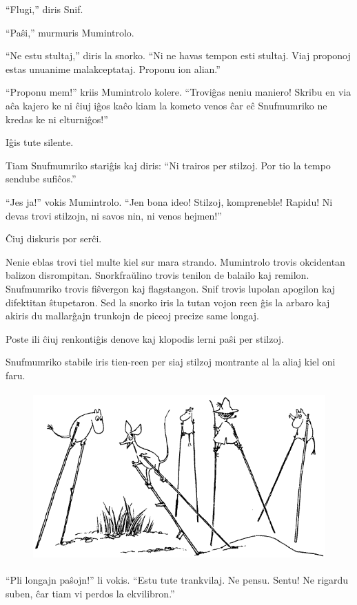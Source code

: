 ``Flugi,'' diris Snif.

``Paŝi,'' murmuris Mumintrolo.

``Ne estu stultaj,'' diris la snorko. ``Ni ne havas tempon esti stultaj. Viaj proponoj estas unuanime malakceptataj. Proponu ion alian.''

``Proponu mem!'' kriis Mumintrolo kolere. ``Troviĝas neniu maniero! Skribu en via aĉa kajero ke ni ĉiuj iĝos kaĉo kiam la kometo venos ĉar eĉ Snufmumriko ne kredas ke ni elturniĝos!''

Iĝis tute silente.

Tiam Snufmumriko stariĝis kaj diris: ``Ni trairos per stilzoj. Por tio la tempo sendube sufiĉos.''

``Jes ja!'' vokis Mumintrolo. ``Jen bona ideo! Stilzoj, kompreneble! Rapidu! Ni devas trovi stilzojn, ni savos nin, ni venos hejmen!''

Ĉiuj diskuris por serĉi.

Nenie eblas trovi tiel multe kiel sur mara strando. Mumintrolo trovis okcidentan balizon disrompitan. Snorkfraŭlino trovis tenilon de balailo kaj remilon. Snufmumriko trovis fiŝvergon kaj flagstangon. Snif trovis lupolan apogilon kaj difektitan ŝtupetaron. Sed la snorko iris la tutan vojon reen ĝis la arbaro kaj akiris du mallarĝajn trunkojn de piceoj precize same longaj.

Poste ili ĉiuj renkontiĝis denove kaj klopodis lerni paŝi per stilzoj.

Snufmumriko stabile iris tien-reen per siaj stilzoj montrante al la aliaj kiel oni faru.

\begin{figure}[htbp]
\centering
\includegraphics[width=331pt,height=184pt]{7-3.png}
\caption{}
\label{7-3}
\end{figure}

``Pli longajn paŝojn!'' li vokis. ``Estu tute trankvilaj. Ne pensu. Sentu! Ne rigardu suben, ĉar tiam vi perdos la ekvilibron.''

